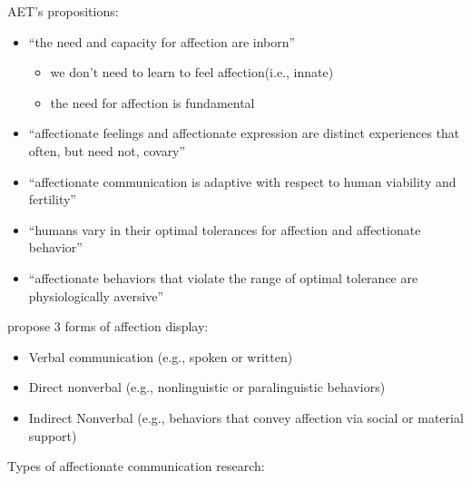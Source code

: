 \documentclass[
]{book}
\providecommand{\tightlist}{%
  \setlength{\itemsep}{0pt}\setlength{\parskip}{0pt}}
\begin{document}
AET's propositions:

\begin{itemize}
\item
  ``the need and capacity for affection are inborn''

  \begin{itemize}
  \item
    we don't need to learn to feel affection(i.e., innate)
  \item
    the need for affection is fundamental
  \end{itemize}
\item
  ``affectionate feelings and affectionate expression are distinct experiences that often, but need not, covary''
\item
  ``affectionate communication is adaptive with respect to human viability and fertility''
\item
  ``humans vary in their optimal tolerances for affection and affectionate behavior''
\item
  ``affectionate behaviors that violate the range of optimal tolerance are physiologically aversive''
\end{itemize}

\citep{Floyd_1998} propose 3 forms of affection display:

\begin{itemize}
\tightlist
\item
  Verbal communication (e.g., spoken or written)
\item
  Direct nonverbal (e.g., nonlinguistic or paralinguistic behaviors)
\item
  Indirect Nonverbal (e.g., behaviors that convey affection via social or material support)
\end{itemize}

Types of affectionate communication research:
\end{document}
